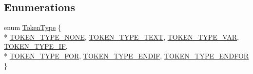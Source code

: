\subsection*{Enumerations}
\begin{DoxyCompactItemize}
\item 
enum \hyperlink{namespacextd_1_1network_1_1http_1_1cpptempl_a39833083d228a5b5ef9f6bb7896479ee}{Token\+Type} \{ \\*
\hyperlink{namespacextd_1_1network_1_1http_1_1cpptempl_a39833083d228a5b5ef9f6bb7896479eeac2aec7f1ab8338419889ff04b8eb0f44}{T\+O\+K\+E\+N\+\_\+\+T\+Y\+P\+E\+\_\+\+N\+O\+NE}, 
\hyperlink{namespacextd_1_1network_1_1http_1_1cpptempl_a39833083d228a5b5ef9f6bb7896479eeaa3056860c42c00806c737551b598885c}{T\+O\+K\+E\+N\+\_\+\+T\+Y\+P\+E\+\_\+\+T\+E\+XT}, 
\hyperlink{namespacextd_1_1network_1_1http_1_1cpptempl_a39833083d228a5b5ef9f6bb7896479eea0e5df4476507663b07b952aefc096a86}{T\+O\+K\+E\+N\+\_\+\+T\+Y\+P\+E\+\_\+\+V\+AR}, 
\hyperlink{namespacextd_1_1network_1_1http_1_1cpptempl_a39833083d228a5b5ef9f6bb7896479eea63ca41e19f481129f654b675913cc557}{T\+O\+K\+E\+N\+\_\+\+T\+Y\+P\+E\+\_\+\+IF}, 
\\*
\hyperlink{namespacextd_1_1network_1_1http_1_1cpptempl_a39833083d228a5b5ef9f6bb7896479eea77914f6881c1bc9ec1910ca843bb6965}{T\+O\+K\+E\+N\+\_\+\+T\+Y\+P\+E\+\_\+\+F\+OR}, 
\hyperlink{namespacextd_1_1network_1_1http_1_1cpptempl_a39833083d228a5b5ef9f6bb7896479eea20879254cae890cea9ab4fbdb6223165}{T\+O\+K\+E\+N\+\_\+\+T\+Y\+P\+E\+\_\+\+E\+N\+D\+IF}, 
\hyperlink{namespacextd_1_1network_1_1http_1_1cpptempl_a39833083d228a5b5ef9f6bb7896479eea7a23df3b1f7078c58e56a3c51c24948c}{T\+O\+K\+E\+N\+\_\+\+T\+Y\+P\+E\+\_\+\+E\+N\+D\+F\+OR}
 \}
\end{DoxyCompactItemize}
